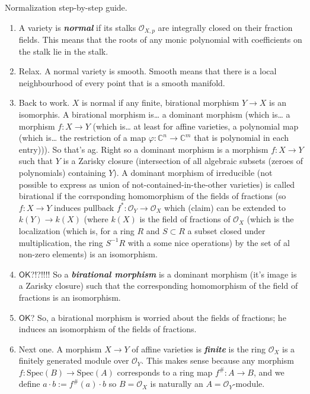 Normalization step-by-step guide.
\begin{enumerate}
\item A variety is \textit{\textbf{normal}} if its stalks  \(\mathcal{O}_{X,p}\) are integrally closed on their fraction fields. This means that the roots of any monic polynomial with coefficients on the stalk lie in the stalk.
\item Relax. A normal variety is smooth. Smooth means that there is a local neighbourhood of every point that is a smooth manifold.
\item Back to work. \(X\) is normal if any finite, birational morphism \(Y \to X\) is an isomorphis. A birational morphism is… a dominant morphism (which is… a morphism \(f:X \to Y\) (which is… at least for affine varieties, a polynomial map (which is… the restriction of a map \(\varphi:\mathbb{C}^n \to \mathbb{C}^m\) that is polynomial in each entry))). So that's ag. Right so a dominant morphism is a morphism \(f:X \to Y\) such that \(Y\) is a Zarisky closure (intersection of all algebraic subsets (zeroes of polynomials) containing \(Y\)). A dominant morphism of irreducible (not possible to express as union of not-contained-in-the-other varieties) is called birational if the corrsponding homomorphism of the fields of fractions (so \(f:X \to Y\) induces pullback \(f^*:\mathcal{O}_Y \to \mathcal{O}_X\) which (claim) can be extended to \(k(Y)\to k(X)\) (where \(k(X)\) is the field of fractions of \(\mathcal{O}_X\) (which is the localization (which is, for a ring \(R\) and \(S \subset R\) a subset closed under multiplication, the ring \(S^{-1}R\) with a some nice operations) by the set of al non-zero elements) is an isomorphism.
\item \(\mathsf{OK}\)?!?!!!! So a \textit{\textbf{birational morphism}} is a dominant morphism (it's image is a Zarisky closure) such that the corresponding homomorphism of the field of fractions is an isomorphism.
\item \(\mathsf{OK}\)? So, a birational morphism is worried about the fields of fractions; he induces an isomorphism of the fields of fractions.
\item Next one. A morphism \(X \to Y\) of affine varieties is \textit{\textbf{finite}} is the ring \(\mathcal{O}_X\) is a finitely generated module over \(\mathcal{O}_Y\). This makes sense because any morphism \( f: \mathrm{Spec}(B) \to \mathrm{Spec}(A) \) corresponds to a ring map \( f^\#: A \to B \), and we define \(a \cdot b := f^\#(a) \cdot b\)
so \( B = \mathcal{O}_X \) is naturally an \( A = \mathcal{O}_Y \)-module.

\end{enumerate}
